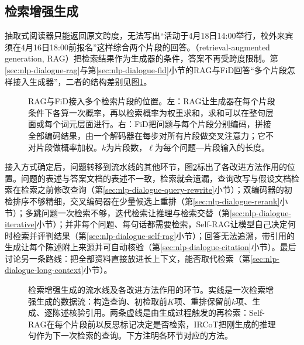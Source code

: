 \subsection{检索增强生成}
\label{sec:nlp-dialogue-rag-family}

抽取式阅读器只能返回原文跨度，无法写出“活动于4月18日14:00举行，校外来宾须在4月16日18:00前报名”这样综合两个片段的回答。（retrieval-augmented generation, RAG）把检索结果作为生成器的条件，答案不再受跨度限制。第\ref{sec:nlp-dialogue-rag}与第\ref{sec:nlp-dialogue-fid}小节的RAG与FiD回答“多个片段怎样接入生成器”，二者的结构差别见图\ref{fig:nlp-dialogue-rag-fid}。

\begin{figure}[htbp]
  \centering
  
  \caption{RAG与FiD接入多个检索片段的位置。左：RAG让生成器在每个片段条件下各算一次概率，再以检索概率为权重求和，求和可以在整句层面或每个词元层面进行。右：FiD把问题与每个片段分别编码，拼接全部编码结果，由一个解码器在每步对所有片段做交叉注意力；它不对片段做概率加权。$k$为片段数，$\ell$为每个问题—片段输入的长度。}
  \label{fig:nlp-dialogue-rag-fid}
\end{figure}

接入方式确定后，问题转移到流水线的其他环节，图\ref{fig:nlp-dialogue-rag-pipeline}标出了各改进方法作用的位置。问题的表述与答案文档的表述不一致，检索就会遗漏，查询改写与假设文档检索在检索之前修改查询（第\ref{sec:nlp-dialogue-query-rewrite}小节）；双编码器的初检排序不够精细，交叉编码器在少量候选上重排（第\ref{sec:nlp-dialogue-rerank}小节）；多跳问题一次检索不够，迭代检索让推理与检索交替（第\ref{sec:nlp-dialogue-iterative}小节）；并非每个问题、每句话都需要检索，Self-RAG让模型自己决定何时检索并评判结果（第\ref{sec:nlp-dialogue-self-rag}小节）；回答无法追溯，带引用的生成让每个陈述附上来源并可自动核验（第\ref{sec:nlp-dialogue-citation}小节）。最后讨论另一条路线：把全部资料直接放进长上下文，能否取代检索（第\ref{sec:nlp-dialogue-long-context}小节）。

\begin{figure}[htbp]
  \centering
  
  \caption{检索增强生成的流水线及各改进方法作用的环节。实线是一次检索增强生成的数据流：构造查询、初检取前$K$项、重排保留前$k$项、生成、逐陈述核验引用。两条虚线是由生成过程触发的再检索：Self-RAG在每个片段前以反思标记决定是否检索，IRCoT把刚生成的推理句作为下一次检索的查询。下方注明各环节对应的方法。}
  \label{fig:nlp-dialogue-rag-pipeline}
\end{figure}

